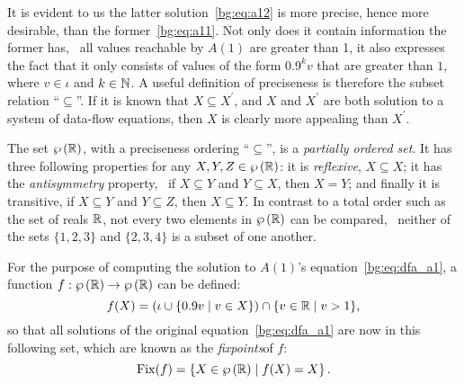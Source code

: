 It is evident to us the latter solution~\eqref{bg:eq:a12} is more precise,
hence more desirable, than the former~\eqref{bg:eq:a11}.  Not only does it
contain information the former has, \ie~all values reachable by $A(1)$ are
greater than 1, it also expresses the fact that it only consists of values
of the form $0.9^k v$ that are greater than $1$, where $v \in \iota$ and $k
\in \mathbb{N}$.  A useful definition of preciseness is therefore the subset
relation ``$\subseteq$''.  If it is known that $X \subseteq X^\prime$, and $X$
and $X^\prime$ are both solution to a system of data-flow equations, then $X$
is clearly more appealing than $X^\prime$.

The set $\wp\left({\mathbb{R}}\right)$, with a preciseness ordering ``$\subseteq$'',
is a \emph{partially ordered set}.  It has three following properties for any
$X, Y, Z \in \wp\left({\mathbb{R}}\right)$: it is \emph{reflexive}, $X \subseteq X$; it
has the \emph{antisymmetry} property, \ie~if $X \subseteq Y$ and $Y \subseteq
X$, then $X = Y$; and finally it is transitive, if $X \subseteq Y$ and $Y
\subseteq Z$, then $X \subseteq Y$.  In contrast to a total order such as the
set of reals $\mathbb{R}$, not every two elements in $\wp\left({\mathbb{R}}\right)$ can be
compared, \eg~neither of the sets $\{1, 2, 3\}$ and $\{2, 3, 4\}$ is a subset
of one another.

For the purpose of computing the solution to $A(1)$'s
equation~\eqref{bg:eq:dfa_a1}, a function $f: \wp\left({\mathbb{R}}\right) \to
\wp\left({\mathbb{R}}\right)$ can be defined:
\begin{equation}
    f(X) = \left(
        \iota \cup \left\{ 0.9 v \mid v \in X \right\}
    \right) \cap \{ v \in \mathbb{R} \mid v > 1 \},
    \label{bg:eq:a1_transfer}
\end{equation}
so that all solutions of the original equation~\eqref{bg:eq:dfa_a1} are now in
this following set, which are known as the \emph{fixpoints}\footnotemark[1] of
$f$:
\begin{equation}
    \mathrm{Fix}(f) = \left\{
        X \in \wp\left({\mathbb{R}}\right) \mid
        f(X) = X
    \right\}.
\end{equation}%
%

